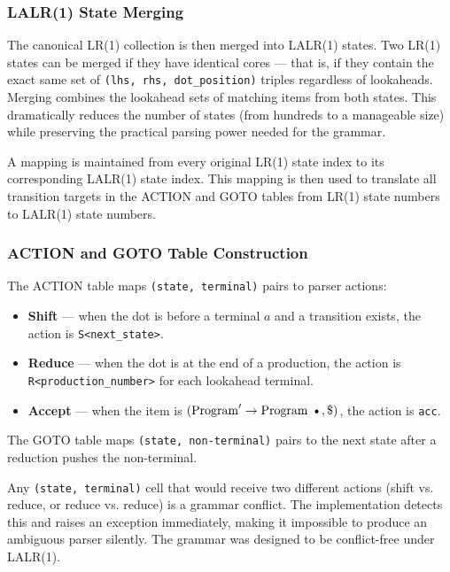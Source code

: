 \documentclass[letterpaper,12pt,oneside]{article}
\begin{document}
\subsubsection{LALR(1) State Merging}
The canonical LR(1) collection is then merged into LALR(1) states. Two LR(1) states can be merged if they have identical cores --- that is, if they contain the exact same set of \texttt{(lhs, rhs, dot\_position)} triples regardless of lookaheads. Merging combines the lookahead sets of matching items from both states. This dramatically reduces the number of states (from hundreds to a manageable size) while preserving the practical parsing power needed for the grammar.

A mapping is maintained from every original LR(1) state index to its corresponding LALR(1) state index. This mapping is then used to translate all transition targets in the ACTION and GOTO tables from LR(1) state numbers to LALR(1) state numbers.

\subsubsection{ACTION and GOTO Table Construction}
The ACTION table maps \texttt{(state, terminal)} pairs to parser actions:
\begin{itemize}
    \item \textbf{Shift} --- when the dot is before a terminal $a$ and a transition exists, the action is \texttt{S<next\_state>}.
    \item \textbf{Reduce} --- when the dot is at the end of a production, the action is \texttt{R<production\_number>} for each lookahead terminal.
    \item \textbf{Accept} --- when the item is $(\text{Program}' \rightarrow \text{Program \textbullet}, \$)$, the action is \texttt{acc}.
\end{itemize}
The GOTO table maps \texttt{(state, non-terminal)} pairs to the next state after a reduction pushes the non-terminal.

Any \texttt{(state, terminal)} cell that would receive two different actions (shift vs. reduce, or reduce vs. reduce) is a grammar conflict. The implementation detects this and raises an exception immediately, making it impossible to produce an ambiguous parser silently. The grammar was designed to be conflict-free under LALR(1).
\end{document}
